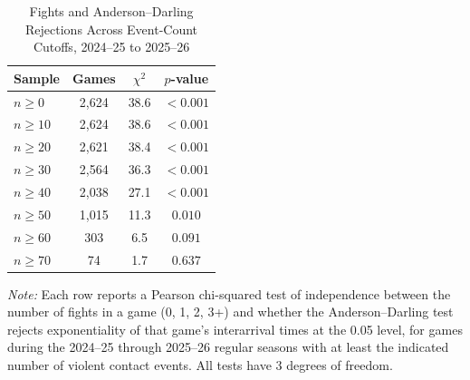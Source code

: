 \begin{table}[htbp]
\centering
\caption{Fights and Anderson--Darling Rejections Across Event-Count Cutoffs, 2024--25 to 2025--26}
\label{tab:fight_vs_AD_rejection_chi_squared_20242025_20252026}
\small
\renewcommand{\arraystretch}{1.12}
\setlength{\tabcolsep}{6pt}

\begin{tabular*}{0.85\textwidth}{@{\extracolsep{\fill}}lccc}
\toprule
Sample & Games & $\chi^2$ & $p$-value \\
\midrule
$n \geq 0$ & 2,624 & 38.6 & $<0.001$ \\
$n \geq 10$ & 2,624 & 38.6 & $<0.001$ \\
$n \geq 20$ & 2,621 & 38.4 & $<0.001$ \\
$n \geq 30$ & 2,564 & 36.3 & $<0.001$ \\
$n \geq 40$ & 2,038 & 27.1 & $<0.001$ \\
$n \geq 50$ & 1,015 & 11.3 & $0.010$ \\
$n \geq 60$ & 303 & 6.5 & $0.091$ \\
$n \geq 70$ & 74 & 1.7 & $0.637$ \\
\bottomrule
\end{tabular*}

\vspace{0.4em}
\parbox{0.85\textwidth}{
\footnotesize
\textit{Note:} Each row reports a Pearson chi-squared test of independence between the number of fights in a game (0, 1, 2, 3+) and whether the Anderson--Darling test rejects exponentiality of that game's interarrival times at the 0.05 level, for games during the 2024--25 through 2025--26 regular seasons with at least the indicated number of violent contact events. All tests have 3 degrees of freedom. 
}
\end{table}
